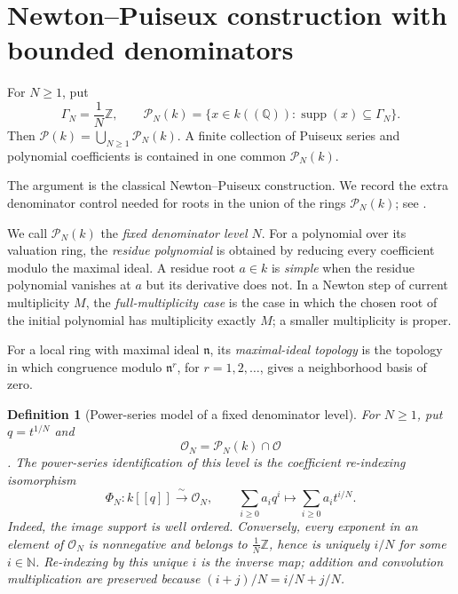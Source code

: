 \documentclass[11pt]{article}
\newcommand{\Puiseux}{\mathcal P(k)}
\newcommand{\Supp}{\operatorname{supp}}
\newcommand{\Ocal}{\mathcal O}
\theoremstyle{proofnote}
\newtheorem{definition}[theorem]{Definition}
\begin{document}
\section{Newton--Puiseux construction with bounded denominators}
\label{sec:puiseux-process}

For \(N\ge1\), put
\[
  \Gamma_N=\frac1N\mathbb Z,\qquad
  \mathcal P_N(k)=
  \{x\in k((\mathbb Q)):\Supp(x)\subseteq\Gamma_N\}.
\]
Then \(\Puiseux=\bigcup_{N\ge1}\mathcal P_N(k)\).  A finite collection of
Puiseux series and polynomial coefficients is contained in one common
\(\mathcal P_N(k)\).

The argument is the classical Newton--Puiseux construction.  We record the
extra denominator control needed for roots in the union of the rings
\(\mathcal P_N(k)\);
see \cite{Walker}.

We call \(\mathcal P_N(k)\) the \emph{fixed denominator level \(N\)}.  For a
polynomial over its valuation ring, the \emph{residue polynomial} is obtained
by reducing every coefficient modulo the maximal ideal.  A residue root
\(a\in k\) is \emph{simple} when the residue polynomial vanishes at \(a\) but
its derivative does not.  In a Newton step of
current multiplicity \(M\), the \emph{full-multiplicity case} is the case in
which the chosen root of the initial polynomial has multiplicity exactly
\(M\); a smaller multiplicity is proper.

For a local ring with maximal ideal \(\mathfrak n\), its
\emph{maximal-ideal topology} is the topology in which congruence modulo
\(\mathfrak n^r\), for \(r=1,2,\ldots\), gives a neighborhood basis of
zero.

\begin{definition}[Power-series model of a fixed denominator level]
\label{def:fixed-level-power-series}
  For \(N\ge1\), put \(q=t^{1/N}\) and
  \[
    \mathcal O_N=\mathcal P_N(k)\cap\Ocal
  \].
  The \emph{power-series identification} of this level is the coefficient
  re-indexing isomorphism
  \[
    \Phi_N:k[[q]]\xrightarrow{\ \sim\ }\mathcal O_N,
    \qquad
    \sum_{i\ge0}a_iq^i\longmapsto\sum_{i\ge0}a_it^{i/N}.
  \]
  Indeed, the image support is well ordered.  Conversely, every exponent in
  an element of \(\mathcal O_N\) is nonnegative and belongs to
  \(\frac1N\mathbb Z\), hence is uniquely \(i/N\) for some
  \(i\in\mathbb N\).  Re-indexing by this unique \(i\) is the inverse map;
  addition and convolution multiplication are preserved because
  \((i+j)/N=i/N+j/N\).
\end{definition}
\end{document}
